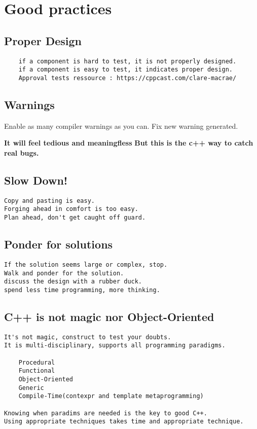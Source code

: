 \documentclass[openany]{report}
\begin{document}
\section{Good practices}

\subsection{Proper Design}

\begin{verbatim}
    if a component is hard to test, it is not properly designed. 
    if a component is easy to test, it indicates proper design. 
    Approval tests ressource : https://cppcast.com/clare-macrae/ 
\end{verbatim}

\subsection{Warnings}

Enable as many compiler warnings as you can. 
Fix new warning generated. 

\textbf{It will feel tedious and meaningfless}
\textbf{But this is the c++ way to catch real bugs.}

\subsection{Slow Down!}

\begin{verbatim}
Copy and pasting is easy. 
Forging ahead in comfort is too easy.
Plan ahead, don't get caught off guard. 
\end{verbatim}

\subsection{Ponder for solutions}

\begin{verbatim}
If the solution seems large or complex, stop. 
Walk and ponder for the solution. 
discuss the design with a rubber duck. 
spend less time programming, more thinking.
\end{verbatim}

\subsection{C++ is not magic nor Object-Oriented}

\begin{verbatim}
It's not magic, construct to test your doubts.
It is multi-disciplinary, supports all programming paradigms.

    Procedural
    Functional
    Object-Oriented
    Generic
    Compile-Time(contexpr and template metaprogramming)

Knowing when paradims are needed is the key to good C++.
Using appropriate techniques takes time and appropriate technique. 
\end{verbatim}
\end{document}

